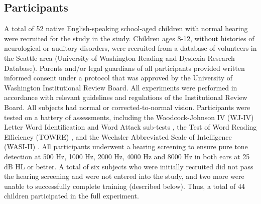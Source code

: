 \documentclass[../uwthesis.tex]{subfiles}
\begin{document}
\subsection{Participants}
A total of 52 native English-speaking school-aged children with normal hearing were
recruited for the study in the study. Children ages 8-12, without histories of neurological or auditory disorders, were recruited from a database of volunteers in the Seattle area (University of Washington Reading and Dyslexia Research Database). Parents and/or legal guardians of all participants provided written informed consent under a protocol that was approved by the University of Washington Institutional Review Board. All experiments were performed in accordance with relevant guidelines and regulations of the Institutional Review Board. All subjects had normal or corrected-to-normal vision. Participants were tested on a battery of assessments, including the Woodcock-Johnson IV (WJ-IV) Letter Word Identification and Word Attack sub-tests \citep{Schrank2014Woodcock-JohnsonAchievement}, the Test of Word Reading Efficiency (TOWRE) \citep{Torgesen2011TOWREEfficiency}, and the Wechsler Abbreviated Scale of Intelligence (WASI-II) \citep{Wechsler2011WechslerManual.}. All participants underwent a hearing screening to ensure pure tone detection at 500 Hz, 1000 Hz, 2000 Hz, 4000 Hz and 8000 Hz in both ears at 25 dB HL or better. A total of six subjects who were initially recruited did not pass the hearing screening and were not entered into the study, and two more were unable to successfully complete training (described below). Thus, a total of 44 children participated in the full experiment.
\end{document}
